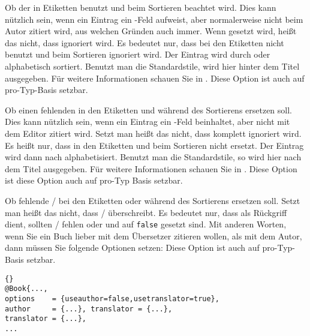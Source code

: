 \documentclass{ltxdockit}[2011/03/25]
\begin{document}
\begin{optionlist}


Ob der  in Etiketten benutzt und
beim  Sortieren beachtet wird. Dies kann nützlich sein, wenn ein Eintrag ein
-Feld aufweist, aber normalerweise nicht beim Autor
zitiert wird, aus welchen Gründen auch immer. Wenn 
gesetzt wird, heißt das nicht, dass  ignoriert wird. Es
bedeutet nur, dass  bei den Etiketten nicht benutzt und beim
Sortieren ignoriert wird. Der Eintrag wird durch  oder
 alphabetisch sortiert. Benutzt man die Standardstile, wird
hier  hinter dem Titel ausgegeben. Für weitere Informationen
schauen Sie in .  Diese Option ist auch
auf pro-Typ-Basis setzbar.


Ob  einen fehlenden
 in den Etiketten und während des Sortierens ersetzen soll.
Dies kann nützlich sein, wenn ein Eintrag ein -Feld
beinhaltet, aber nicht mit dem Editor zitiert wird. Setzt man
 heißt das nicht, dass  komplett
ignoriert wird. Es heißt nur, dass   in den
Etiketten und beim Sortieren nicht ersetzt. Der Eintrag wird dann nach
 alphabetisiert. Benutzt man die Standardstile, so wird hier
 nach dem Titel ausgegeben. Für weitere Informationen schauen
Sie in .
Diese Option ist diese Option auch auf pro-Typ Basis setzbar.


Ob  fehlende
\slash {} bei den Etiketten oder während des
Sortierens ersetzen soll. Setzt man  heißt das nicht,
dass  \slash {}
überschreibt. Es bedeutet nur, dass  als Rückgriff dient,
sollten \slash {} fehlen oder 
und  auf \texttt{false} gesetzt sind. Mit anderen Worten, wenn
Sie ein Buch lieber mit dem Übersetzer zitieren wollen, als mit dem Autor, dann müssen
Sie folgende Optionen setzen: Diese Option ist auch auf
pro-Typ-Basis setzbar.

\begin{lstlisting}[style=bibtex]{}
@Book{..., 
options    = {useauthor=false,usetranslator=true},
author     = {...}, translator = {...},
translator = {...},
...
\end{lstlisting} 


\end{optionlist}
\end{document}
